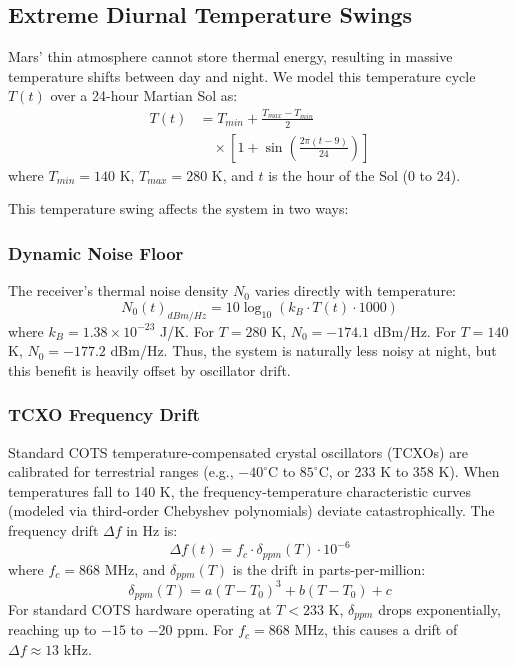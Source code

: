\documentclass{ijuc}
\begin{document}
\subsection{Extreme Diurnal Temperature Swings}
Mars' thin atmosphere cannot store thermal energy, resulting in massive temperature shifts between day and night. We model this temperature cycle $T(t)$ over a 24-hour Martian Sol as:
\begin{equation}
\begin{split}
    T(t) &= T_{min} + \frac{T_{max} - T_{min}}{2} \\
    &\quad \times \left[1 + \sin\left(\frac{2\pi(t - 9)}{24}\right)\right]
\end{split}
\end{equation}
where $T_{min} = 140$ K, $T_{max} = 280$ K, and $t$ is the hour of the Sol (0 to 24).

This temperature swing affects the system in two ways:
\subsubsection{Dynamic Noise Floor}
The receiver's thermal noise density $N_0$ varies directly with temperature:
\begin{equation}
    N_0(t)_{dBm/Hz} = 10\log_{10}\left(k_B \cdot T(t) \cdot 1000\right)
\end{equation}
where $k_B = 1.38 \times 10^{-23}$ J/K. 
For $T = 280$ K, $N_0 = -174.1$ dBm/Hz. For $T = 140$ K, $N_0 = -177.2$ dBm/Hz. Thus, the system is naturally less noisy at night, but this benefit is heavily offset by oscillator drift.

\subsubsection{TCXO Frequency Drift}
Standard COTS temperature-compensated crystal oscillators (TCXOs) are calibrated for terrestrial ranges (e.g., $-40^\circ$C to $85^\circ$C, or 233 K to 358 K). When temperatures fall to 140 K, the frequency-temperature characteristic curves (modeled via third-order Chebyshev polynomials) deviate catastrophically. The frequency drift $\Delta f$ in Hz is:
\begin{equation}
    \Delta f(t) = f_c \cdot \delta_{ppm}(T) \cdot 10^{-6}
\end{equation}
where $f_c = 868$ MHz, and $\delta_{ppm}(T)$ is the drift in parts-per-million:
\begin{equation}
    \delta_{ppm}(T) = a(T-T_0)^3 + b(T-T_0) + c
\end{equation}
For standard COTS hardware operating at $T < 233$ K, $\delta_{ppm}$ drops exponentially, reaching up to $-15$ to $-20$ ppm. For $f_c = 868$ MHz, this causes a drift of $\Delta f \approx 13$ kHz. 
\end{document}
